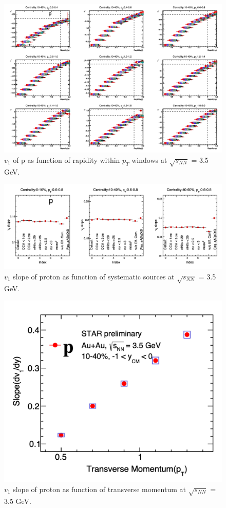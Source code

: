\begin{figure}[hbt!]
\centering
\includegraphics[width=0.95\linewidth]{figures/chapter03/3p5gev_proton_v1yPt_sysUnc.png}
\caption{$v_1$ of p as function of rapidity within $p_T$ windows at $\sqrt{s_{NN}}$ = 3.5 GeV.}
\label{fig:3p5gev_proton_v1yPt_sysUnc}
\end{figure}

\begin{figure}[hbt!]
\centering
\includegraphics[width=0.85\linewidth]{figures/chapter03/3p5gev_proton_v1slopeIndex_sysUnc.png}
\caption{$v_1$ slope of proton as function of systematic sources at $\sqrt{s_{NN}}$ = 3.5 GeV.}
\label{fig:3p5gev_proton_v1slopeIndex_sysUnc}
\end{figure}

\begin{figure}[hbt!]
\centering
\includegraphics[width=0.55\linewidth]{figures/chapter03/3p5gev_proton_v1slopePt.png}
\caption{$v_1$ slope of proton as function of transverse momentum at $\sqrt{s_{NN}}$ = 3.5 GeV.}
\label{fig:3p5gev_proton_v1slopePt}
\end{figure}